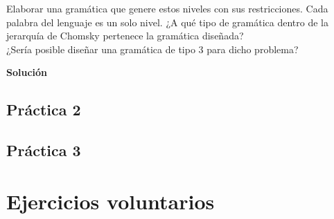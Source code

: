 \documentclass[11pt,a4paper]{article}
\newcommand{\sol}{\textbf{Solución}}
\newcommand{\noindentsect}{\setlength{\parindent}{0pt}}
\newcommand{\defaultindent}{\setlength{\parindent}{15pt}}
\begin{document}
	\noindentsect
	Elaborar una gramática que genere estos niveles con sus restricciones. Cada palabra del 
	lenguaje es un solo nivel. ¿A qué tipo de gramática dentro de la jerarquía de Chomsky 
	pertenece la gramática diseñada?\\
	
	¿Sería posible diseñar una gramática de tipo 3 para dicho problema?\par
	
	\defaultindent
	\sol
	
	\newpage
	\subsection{Práctica 2}
	
	\newpage
	\subsection{Práctica 3}
	
	\newpage
	\section{Ejercicios voluntarios}
\end{document}
